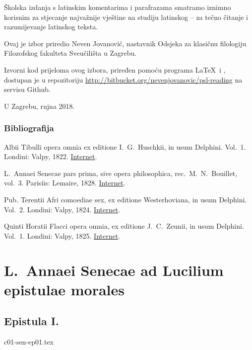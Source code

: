 \documentclass[a4paper,12pt,twoside]{report}
\begin{document}
Školska izdanja s latinskim komentarima i parafrazama smatramo iznimno korisnim za stjecanje najvažnije vještine na studiju latinskog – za tečno čitanje i razumijevanje latinskog teksta.

Ovaj je izbor priredio Neven Jovanović, nastavnik Odsjeka za klasičnu filologiju Filozofskog fakulteta Sveučilišta u Zagrebu.

Izvorni kod prijeloma ovog izbora, priređen pomoću programa \LaTeX\ i \XeLaTeX, dostupan je u repozitoriju \url{http://bitbucket.org/nevenjovanovic/psl-reading} na servisu Github.



\medskip

U Zagrebu, rujna 2018.

\section*{Bibliografija}

{
\setlength{\parindent}{0pt}

Albii Tibulli opera omnia ex editione I.\ G.\ Huschkii, in usum Delphini. Vol.\ 1. Londini: Valpy, 1822. \href{https://archive.org/details/delphinclassics173valp}{Internet}.

L.\ Annaei Senecae pars prima, sive opera philosophica, rec.\ M.\ N.\ Bouillet, vol.\ 3. Parisiis: Lemaire, 1828. \href{https://archive.org/details/lannsenecparspr03bouigoog}{Internet}.

Pub. Terentii Afri comoediae sex, ex editione Westerhoviana, in usum Delphini. Vol.\ 2. Londini: Valpy, 1824. \href{https://archive.org/details/pubterentiiafric02tereuoft}{Internet}.

Quinti Horatii Flacci opera omnia, ex editione J.\ C.\ Zeunii, in usum Delphini. Vol.\ 1.  Londini: Valpy, 1825. \href{https://archive.org/details/delphinclassics57valp}{Internet}.

}


\part{L.\ Annaei Senecae ad Lucilium epistulae morales}

\chapter{Epistula I.}

{c01-sen-ep01.tex}
\end{document}
